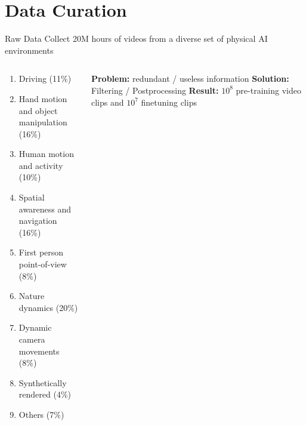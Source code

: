 \documentclass{beamer}
\begin{document}
\section{Data Curation}

\begin{frame}[t]{Raw Data}
    Collect 20M hours of videos from a diverse set of physical AI environments
    \begin{columns}
        \hspace{1em}
		\begin{column}{.5\textwidth}
            \small
            \begin{enumerate}[label=\arabic*., itemsep=0.5mm]
                \item Driving (11\%)
                \item Hand motion and object manipulation (16\%)
                \item Human motion and activity (10\%)
                \item Spatial awareness and navigation (16\%)
                \item First person point-of-view (8\%)
                \item Nature dynamics (20\%)
                \item Dynamic camera movements (8\%)
                \item Synthetically rendered (4\%)
                \item Others (7\%)
            \end{enumerate}
            \normalsize
		\end{column}
        \hspace{0em}
		\begin{column}{.5\textwidth}
            \pause
            \textbf{Problem:} redundant / useless information \newline
            \textbf{Solution:} Filtering / Postprocessing \newline
            \textbf{Result:} $10^8$ pre-training video clips and $10^7$ finetuning clips 

		\end{column}
        \hspace{2em}
	\end{columns}
\end{frame}
\end{document}
